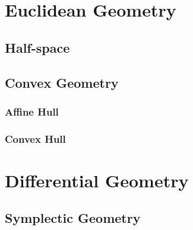 \section{Euclidean Geometry}\label{sec:euclidean_geometry}

\subsection{Half-space}\label{sec:half_space}

\subsection{Convex Geometry}\label{sec:convex_geometry}

\subsubsection{Affine Hull}\label{sec:affine_hull}

\subsubsection{Convex Hull}\label{sec:convex_hull}



\section{Differential Geometry}\label{sec:differential_geometry}

\subsection{Symplectic Geometry}\label{sec:symplectic_geometry}

